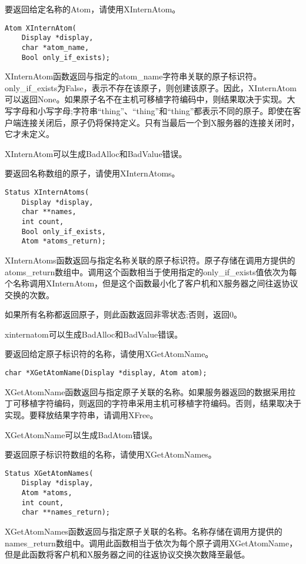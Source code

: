要返回给定名称的Atom，请使用XInternAtom。

\begin{lstlisting}
Atom XInternAtom(
	Display *display,
	char *atom_name,
	Bool only_if_exists);
\end{lstlisting}

XInternAtom函数返回与指定的atom\_name字符串关联的原子标识符。only\_if\_exists为False，表示不存在该原子，则创建该原子。因此，XInternAtom可以返回None。如果原子名不在主机可移植字符编码中，则结果取决于实现。大写字母和小写字母;字符串“thing”、“thing”和“thing”都表示不同的原子。即使在客户端连接关闭后，原子仍将保持定义。只有当最后一个到X服务器的连接关闭时，它才未定义。

XInternAtom可以生成BadAlloc和BadValue错误。

要返回名称数组的原子，请使用XInternAtoms。
\begin{lstlisting}
Status XInternAtoms(
	Display *display,
	char **names,
	int count,
	Bool only_if_exists,
	Atom *atoms_return);
\end{lstlisting}

XInternAtoms函数返回与指定名称关联的原子标识符。原子存储在调用方提供的atoms\_return数组中。调用这个函数相当于使用指定的only\_if\_exists值依次为每个名称调用XInternAtom，但是这个函数最小化了客户机和X服务器之间往返协议交换的次数。

如果所有名称都返回原子，则此函数返回非零状态;否则，返回0。

xinternatom可以生成BadAlloc和BadValue错误。

要返回给定原子标识符的名称，请使用XGetAtomName。

\begin{lstlisting}
char *XGetAtomName(Display *display, Atom atom);
\end{lstlisting}

XGetAtomName函数返回与指定原子关联的名称。如果服务器返回的数据采用拉丁可移植字符编码，则返回的字符串采用主机可移植字符编码。否则，结果取决于实现。要释放结果字符串，请调用XFree。

XGetAtomName可以生成BadAtom错误。

要返回原子标识符数组的名称，请使用XGetAtomNames。

\begin{lstlisting}
Status XGetAtomNames(
	Display *display,
	Atom *atoms,
	int count,
	char **names_return);
\end{lstlisting}

XGetAtomNames函数返回与指定原子关联的名称。名称存储在调用方提供的names\_return数组中。调用此函数相当于依次为每个原子调用XGetAtomName，但是此函数将客户机和X服务器之间的往返协议交换次数降至最低。

